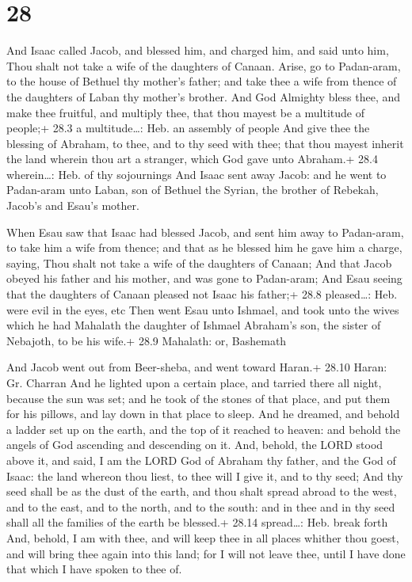 \hypertarget{section-27}{%
\section{28}\label{section-27}}

 And Isaac called Jacob, and blessed him, and charged him,
and said unto him, Thou shalt not take a wife of the daughters of
Canaan.  Arise, go to Padan-aram, to the house of Bethuel
thy mother's father; and take thee a wife from thence of the daughters
of Laban thy mother's brother.  And God Almighty bless thee,
and make thee fruitful, and multiply thee, that thou mayest be a
multitude of people;+ 28.3 a multitude\ldots: Heb. an assembly of people
 And give thee the blessing of Abraham, to thee, and to thy
seed with thee; that thou mayest inherit the land wherein thou art a
stranger, which God gave unto Abraham.+ 28.4 wherein\ldots: Heb. of thy
sojournings  And Isaac sent away Jacob: and he went to
Padan-aram unto Laban, son of Bethuel the Syrian, the brother of
Rebekah, Jacob's and Esau's mother.

 When Esau saw that Isaac had blessed Jacob, and sent him
away to Padan-aram, to take him a wife from thence; and that as he
blessed him he gave him a charge, saying, Thou shalt not take a wife of
the daughters of Canaan;  And that Jacob obeyed his father
and his mother, and was gone to Padan-aram;  And Esau seeing
that the daughters of Canaan pleased not Isaac his father;+ 28.8
pleased\ldots: Heb. were evil in the eyes, etc  Then went
Esau unto Ishmael, and took unto the wives which he had Mahalath the
daughter of Ishmael Abraham's son, the sister of Nebajoth, to be his
wife.+ 28.9 Mahalath: or, Bashemath

 And Jacob went out from Beer-sheba, and went toward
Haran.+ 28.10 Haran: Gr. Charran  And he lighted upon a
certain place, and tarried there all night, because the sun was set; and
he took of the stones of that place, and put them for his pillows, and
lay down in that place to sleep.  And he dreamed, and
behold a ladder set up on the earth, and the top of it reached to
heaven: and behold the angels of God ascending and descending on it.
 And, behold, the LORD stood above it, and said, I am the
LORD God of Abraham thy father, and the God of Isaac: the land whereon
thou liest, to thee will I give it, and to thy seed;  And
thy seed shall be as the dust of the earth, and thou shalt spread abroad
to the west, and to the east, and to the north, and to the south: and in
thee and in thy seed shall all the families of the earth be blessed.+
28.14 spread\ldots: Heb. break forth  And, behold, I am
with thee, and will keep thee in all places whither thou goest, and will
bring thee again into this land; for I will not leave thee, until I have
done that which I have spoken to thee of.

